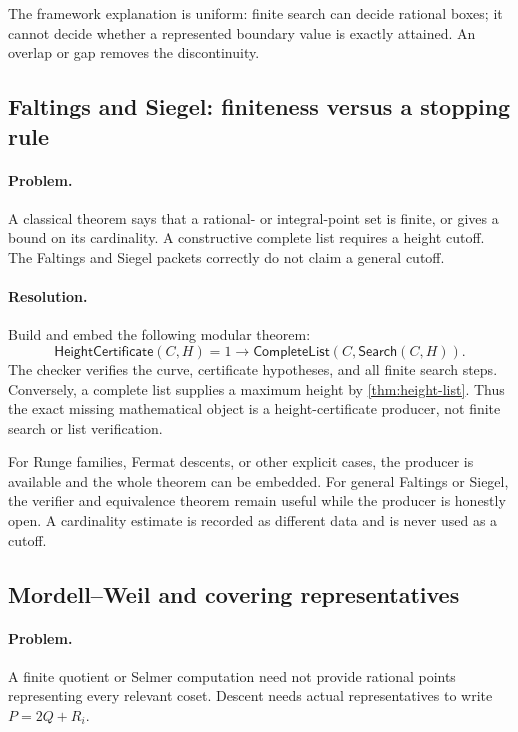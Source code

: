 The framework explanation is uniform: finite search can decide rational boxes;
it cannot decide whether a represented boundary value is exactly attained.
An overlap or gap removes the discontinuity.

\subsection{Faltings and Siegel: finiteness versus a stopping rule}

\paragraph{Problem.}
A classical theorem says that a rational- or integral-point set is finite, or
gives a bound on its cardinality.  A constructive complete list requires a
height cutoff.  The Faltings and Siegel packets correctly do not claim a
general cutoff.

\paragraph{Resolution.}
Build and embed the following modular theorem:
\[
 \mathsf{HeightCertificate}(C,H)=1
 \to
 \mathsf{CompleteList}(C,\mathsf{Search}(C,H)).
\]
The checker verifies the curve, certificate hypotheses, and all finite search
steps.  Conversely, a complete list supplies a maximum height by
\cref{thm:height-list}.  Thus the exact missing mathematical object is a
height-certificate producer, not finite search or list verification.

For Runge families, Fermat descents, or other explicit cases, the producer is
available and the whole theorem can be embedded.  For general Faltings or
Siegel, the verifier and equivalence theorem remain useful while the producer
is honestly open.  A cardinality estimate is recorded as different data and
is never used as a cutoff.

\subsection{Mordell--Weil and covering representatives}

\paragraph{Problem.}
A finite quotient or Selmer computation need not provide rational points
representing every relevant coset.  Descent needs actual representatives to
write \(P=2Q+R_i\).

